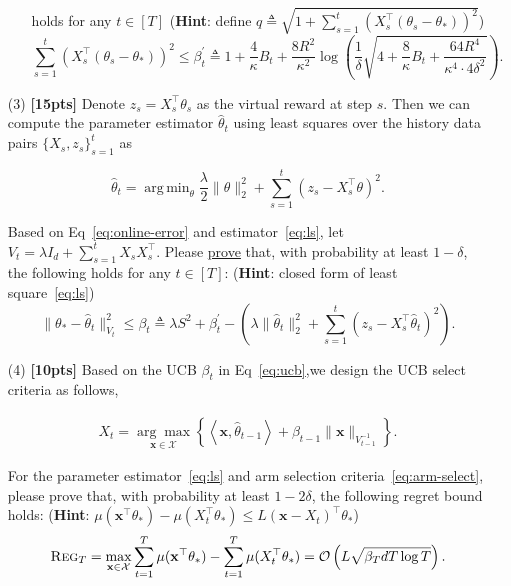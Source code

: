 \documentclass[a4paper]{article}
\numberwithin{equation}{section}
\theoremstyle{definition}
\DeclareMathOperator*{\argmin}{arg\,min}
\theoremstyle{definition}
\def \reg {\textsc{Reg}}
\begin{document}
\begin{enumerate}
\begin{enumerate}
    holds for any $t \in [T]$ (\textbf{Hint}: define $q
     \triangleq \sqrt{1+\sum_{s=1}^t\left(X_s^{\top}\left(\theta_s-\theta_*\right)\right)^2}$)
    \begin{equation}\label{eq:online-error}
      \sum_{s=1}^t\left(X_s^{\top}\left(\theta_s-\theta_*\right)\right)^2 \leq \beta_t^\prime \triangleq 1+\frac{4}{\kappa} B_t+\frac{8 R^2}{\kappa^2} \log \left(\frac{1}{\delta} \sqrt{4+\frac{8}{\kappa} B_t+\frac{64 R^4}{\kappa^4 \cdot 4 \delta^2}}\right).
    \end{equation}
  \end{enumerate}
  \item[(3)] \textbf{[15pts]} Denote $z_s = X_s^\top \theta_s$ as the virtual reward at step $s$. Then we can compute the parameter estimator $\widehat{\theta}_t$ using least squares over the history data pairs $\{X_s, z_s\}_{s=1}^t$ as
  \begin{tcolorbox}
    \begin{equation}\label{eq:ls}
      \widehat{\theta}_t = \argmin_{\theta} \frac{\lambda}{2}\|\theta\|^2_2+\sum_{s=1}^t\left(z_s - X_s^{\top}\theta\right)^2.
    \end{equation}
  \end{tcolorbox}
  Based on Eq~\eqref{eq:online-error} and estimator~\eqref{eq:ls}, let 
  $V_t = \lambda I_d + \sum_{s=1}^t X_s X_s^\top$. Please \underline{prove} that, with probability at least $1-\delta$, the following holds for any $t \in [T]$: (\textbf{Hint}: closed form of least square~\eqref{eq:ls})
  \begin{equation}\label{eq:ucb}
    \|\theta_*-\widehat{\theta}_t\|_{V_{t}}^2\leq \beta_t \triangleq  \lambda S^2 +\beta^\prime_t - \left(\lambda\|\widehat{\theta}_t\|_2^2+\sum_{s=1}^t\left(z_s - X_s^{\top}\widehat{\theta}_t\right)^2\right).
  \end{equation}
  \item[(4)] \textbf{[10pts]} Based on the UCB $\beta_t$ in Eq~\eqref{eq:ucb},we design the UCB select criteria as follows,
\begin{tcolorbox}[top=-1pt]
    \begin{align}\label{eq:arm-select}
      X_t =\underset{\mathbf{x} \in \mathcal{X}}{\arg \max }\left\{\left\langle\mathbf{x}, 
      \widehat{\theta}_{t-1}\right\rangle+\beta_{t-1}\|\mathbf{x}\|_{V_{t-1}^{-1}}\right\}.
    \end{align}
  \end{tcolorbox}
  For the parameter estimator~\eqref{eq:ls} and arm selection criteria~\eqref{eq:arm-select}, please prove that, with probability at least $1-2 \delta$, the following regret bound 
  holds: (\textbf{Hint}: $\mu(\mathbf{x}^\top \theta_*) -\mu(X_t^{\top} \theta_*)\leq L (\mathbf{x} - X_t)^\top\theta_*$)
  \begin{equation*}
    \reg_T=\max _{\mathbf{x} \in \mathcal{X}}\sum_{t=1}^T  \mu(\mathbf{x}^{\top} \theta_*)-\sum_{t=1}^T \mu(X_t^{\top} \theta_*)=\mathcal{O}\left(L \sqrt{\beta_T d T \log T}\right).
  \end{equation*}
\end{enumerate}
\end{document}
